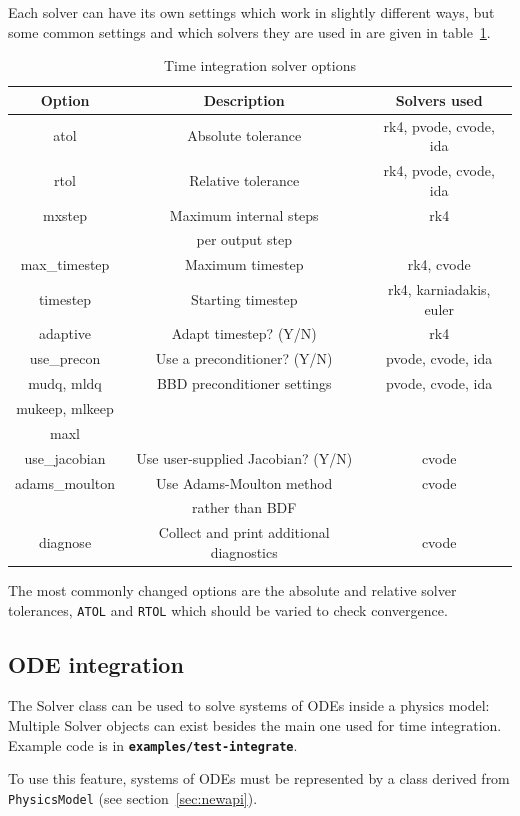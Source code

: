 \documentclass[12pt]{article}
\newcommand{\code}[1]{\texttt{#1}}
\newcommand{\file}[1]{\texttt{\bf #1}}
\begin{document}
Each solver can have its own settings which work in slightly different ways, but some common
settings and which solvers they are used in are given in table~\ref{tab:solveropts}.
\begin{table}[htb!]
\centering
\caption{Time integration solver options}
\label{tab:solveropts}
\begin{tabular}{c | c | c}
\hline
Option & Description & Solvers used \\
\hline
atol & Absolute tolerance & rk4, pvode, cvode, ida \\
rtol & Relative tolerance & rk4, pvode, cvode, ida \\
mxstep & Maximum internal steps  & rk4 \\
       & per output step & \\
max\_timestep & Maximum timestep & rk4, cvode \\
timestep & Starting timestep & rk4, karniadakis, euler \\
adaptive & Adapt timestep? (Y/N) & rk4 \\
use\_precon & Use a preconditioner? (Y/N) & pvode, cvode, ida \\
mudq, mldq & BBD preconditioner settings & pvode, cvode, ida \\
mukeep, mlkeep & & \\
maxl & & \\
use\_jacobian & Use user-supplied Jacobian? (Y/N) & cvode \\
adams\_moulton & Use Adams-Moulton method & cvode \\
 & rather than BDF & \\
diagnose & Collect and print additional diagnostics & cvode \\
\hline
\end{tabular}
\end{table}
The most commonly changed options are the  absolute and relative solver tolerances,
\code{ATOL} and \code{RTOL} which should be varied to check convergence.


\subsection{ODE integration}

The Solver class can be used to solve systems of ODEs inside a physics model: Multiple Solver objects
can exist besides the main one used for time integration.
Example code is in \file{examples/test-integrate}.

To use this feature, systems of ODEs must be represented by a class derived
from \code{PhysicsModel} (see section~\ref{sec:newapi}).
\end{document}
